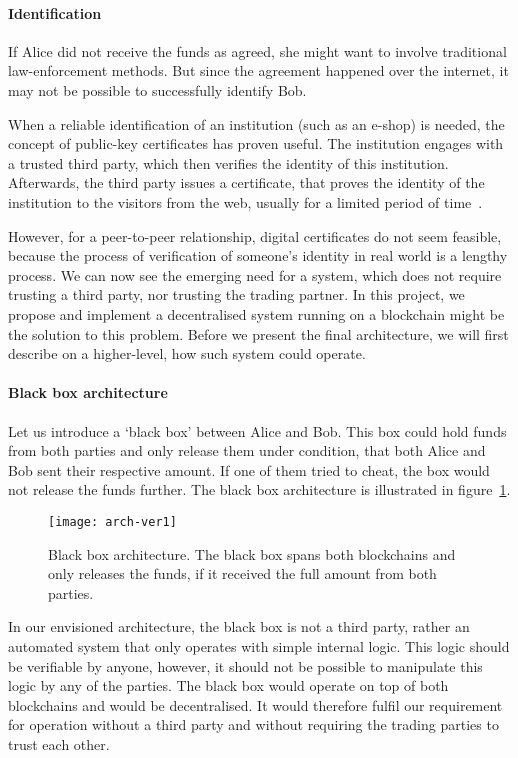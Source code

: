 \paragraph{Identification} 
If Alice did not receive the funds as agreed, she might want to involve traditional law-enforcement methods. But since the agreement happened over the internet, it may not be possible to successfully identify Bob.

When a reliable identification of an institution (such as an e-shop) is needed, the concept of public-key certificates has proven useful. The institution engages with a trusted third party, which then verifies the identity of this institution. Afterwards, the third party issues a certificate, that proves the identity of the institution to the visitors from the web, usually for a limited period of time~\cite{Lee2013SecurityArchitects}. 

However, for a peer-to-peer relationship, digital certificates do not seem feasible, because the process of verification of someone's identity in real world is a lengthy process. We can now see the emerging need for a system, which does not require trusting a third party, nor trusting the trading partner. In this project, we propose and implement a decentralised system running on a blockchain might be the solution to this problem. Before we present the final architecture, we will first describe on a higher-level, how such system could operate.

\paragraph{Black box architecture}
Let us introduce a `black box' between Alice and Bob. This box could hold funds from both parties and only release them under condition, that both Alice and Bob sent their respective amount. If one of them tried to cheat, the box would not release the funds further. The black box architecture is illustrated in figure~\ref{fig:arch-ver1}.
% 
\begin{figure}[ht]
    \centering
    \texttt{[image: arch-ver1]}
    \caption{Black box architecture. The black box spans both blockchains and only releases the funds, if it received the full amount from both parties.}
    \label{fig:arch-ver1}
\end{figure}

In our envisioned architecture, the black box is not a third party, rather an automated system that only operates with simple internal logic. This logic should be verifiable by anyone, however, it should not be possible to manipulate this logic by any of the parties. The black box would operate on top of both blockchains and would be decentralised. It would therefore fulfil our requirement for operation without a third party and without requiring the trading parties to trust each other.

